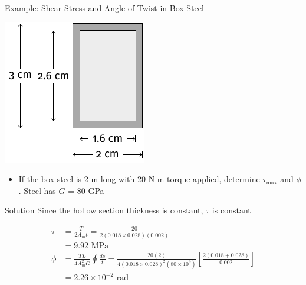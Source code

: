 \documentclass[10pt, svgnames]{beamer}
\begin{document}
\begin{frame}[label={sec:org6352e0f}]{Example: Shear Stress and Angle of Twist in Box Steel}
\begin{center}
\includegraphics[height=0.5\textheight]{pictures/thin-walled-example.pdf}
\end{center}

\begin{itemize}
\item If the box steel is 2 m long with 20 N-m torque applied, determine
\(\tau_{\max}\) and \(\phi\). Steel has \(G\) = 80 GPa
\end{itemize}
\end{frame}

\begin{frame}[label={sec:orgce6c0e5}]{Solution}
Since the hollow section thickness is constant, \(\tau\) is constant

\begin{align*}
    \tau &= \frac{T}{2 A_{m} t} = \frac{20}{2 (0.018 \times 0.028) (0.002)} \\
         &= 9.92 \text{ MPa} \\
    \phi &= \frac{TL}{4A_{m}^{2}G} \oint \frac{ds}{t} = \frac{20(2)}{4(0.018 \times 0.028)^{2}(80 \times 10^{9})} \left[ \frac{2(0.018+0.028)}{0.002} \right] \\
         &= 2.26 \times 10^{-2} \text{ rad}
\end{align*}
\end{frame}
\end{document}
